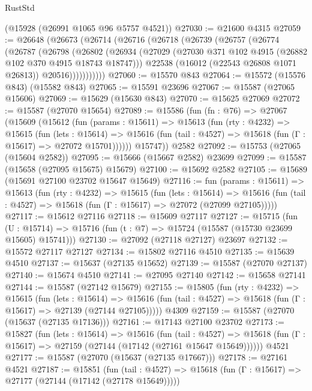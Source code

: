 \begin{lexlean}{RustStd}
\begin{coremodule}
    (@15928 (@26991 @1065 @96 @5757 @4521))
@27030 := @21600 @4315
@27059 := @26648
    (@26673
      (@26714
        (@26716
          (@26718
            (@26739
              (@26757
                (@26774
                  (@26787
                    (@26798
                      (@26802
                        (@26934
                          (@27029 (@27030 @371 @102 @4915 (@26882 @102 @370 @4915 @18743 @18747)))
                          @22538
                          (@16012 (@22543 @26808 @1071 @26813))
                          @20516)))))))))))
@27060 := @15570 @843
@27064 := @15572 (@15576 @843) (@15582 @843)
@27065 := @15591 @23696
@27067 := @15587 (@27065 @15606)
@27069 := @15629 (@15630 @843)
@27070 := @15625 @27069
@27072 := @15587 (@27070 @15654)
@27089 := @15586
    (fun (fn : @76) =>
    @27067
      (@15609
        (@15612
          (fun (params : @15611) =>
          @15613
            (fun (rty : @4232) =>
            @15615
              (fun (lets : @15614) =>
              @15616 (fun (tail : @4527) => @15618 (fun (Γ : @15617) => @27072 @15701))))))
        @15747))
    @2582
@27092 := @15753 (@27065 (@15604 @2582))
@27095 := @15666 (@15667 @2582) @23699
@27099 := @15587 (@15658 (@27095 @15675) @15679)
@27100 := @15692 @2582
@27105 := @15689 (@15691 @27100 @23702 @15647 @15649)
@27116 := fun (params : @15611) =>
  @15613
    (fun (rty : @4232) =>
    @15615
      (fun (lets : @15614) =>
      @15616 (fun (tail : @4527) => @15618 (fun (Γ : @15617) => @27072 (@27099 @27105)))))
@27117 := @15612 @27116
@27118 := @15609 @27117
@27127 := @15715
    (fun (U : @15714) => @15716 (fun (t : @7) => @15724 (@15587 (@15730 @23699 @15605) @15741)))
@27130 := @27092 (@27118 @27127) @23697
@27132 := @15572 @27117 @27127
@27134 := @15802 @27116 @4510
@27135 := @15639 @4510
@27137 := @15637 (@27135 @15652)
@27139 := @15587 (@27070 @27137)
@27140 := @15674 @4510
@27141 := @27095 @27140
@27142 := @15658 @27141
@27144 := @15587 (@27142 @15679)
@27155 := @15805
    (fun (rty : @4232) =>
    @15615
      (fun (lets : @15614) =>
      @15616 (fun (tail : @4527) => @15618 (fun (Γ : @15617) => @27139 (@27144 @27105)))))
    @4309
@27159 := @15587 (@27070 (@15637 (@27135 @17136)))
@27161 := @17143 @27100 @23702
@27173 := @15827
    (fun (lets : @15614) =>
    @15616
      (fun (tail : @4527) =>
      @15618 (fun (Γ : @15617) => @27159 (@27144 (@17142 (@27161 @15647 @15649))))))
    @4521
@27177 := @15587 (@27070 (@15637 (@27135 @17667)))
@27178 := @27161 @4521
@27187 := @15851
    (fun (tail : @4527) => @15618 (fun (Γ : @15617) => @27177 (@27144 (@17142 (@27178 @15649)))))

\end{coremodule}
\end{lexlean}
